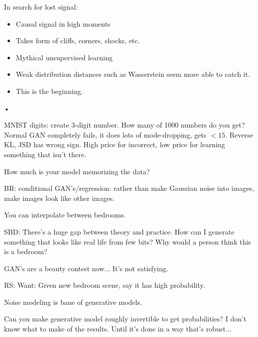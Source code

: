 In search for lost signal:
\begin{itemize}
\item
Causal signal in high moments
\item
Takes form of cliffs, corners, shocks, etc.
\item
Mythical unsupervised learning
\item
Weak distribution distances such as Wasserstein seem more able to catch it.
\item
This is the beginning.
\end{itemize}•

MNIST digits: create 3-digit number. How many of 1000 numbers do you get? Normal GAN completely fails, it does lots of mode-dropping, gets $<15$. Reverse KL, JSD has wrong sign. High price for incorrect, low price for learning something that isn't there.

How much is your model memorizing the data?

BR: conditional GAN's/regression: rather than make Gaussian noise into images, make images look like other images.

You can interpolate between bedrooms.

SBD: There's a huge gap between theory and practice. How can I generate something that looks like real life from few bits? Why would a person think this is a bedroom?

GAN's are a beauty contest now... It's not satisfying. 

RS: Want: Given new bedroom scene, say it has high probability.

Noise modeling is bane of generative models.

Can you make generative model roughly invertible to get probabilities? I don't know what to make of the results. Until it's done in a way that's robust...